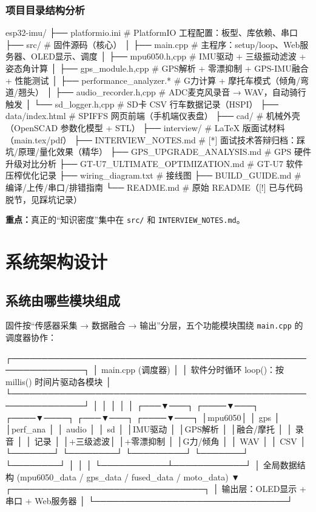 \documentclass[UTF8,11pt,a4paper]{ctexart}
\begin{document}
\subsubsection{项目目录结构分析}
\begin{ascii}
esp32-imu/
├── platformio.ini              # PlatformIO 工程配置：板型、库依赖、串口
├── src/                        # 固件源码（核心）
│   ├── main.cpp                # 主程序：setup/loop、Web服务器、OLED显示、调度
│   ├── mpu6050.{h,cpp}         # IMU驱动 + 三级振动滤波 + 姿态角计算
│   ├── gps_module.{h,cpp}      # GPS解析 + 零漂抑制 + GPS-IMU融合 + 性能测试
│   ├── performance_analyzer.*  # G力计算 + 摩托车模式（倾角/弯道/翘头）
│   ├── audio_recorder.{h,cpp}  # ADC麦克风录音 → WAV，自动骑行触发
│   └── sd_logger.{h,cpp}       # SD卡 CSV 行车数据记录（HSPI）
├── data/index.html             # SPIFFS 网页前端（手机端仪表盘）
├── cad/                        # 机械外壳（OpenSCAD 参数化模型 + STL）
├── interview/                  # LaTeX 版面试材料（main.tex/pdf）
├── INTERVIEW_NOTES.md          # [*] 面试技术答辩归档：踩坑/原理/量化效果（精华）
├── GPS_UPGRADE_ANALYSIS.md     # GPS 硬件升级对比分析
├── GT-U7_ULTIMATE_OPTIMIZATION.md  # GT-U7 软件压榨优化记录
├── wiring_diagram.txt          # 接线图
├── BUILD_GUIDE.md              # 编译/上传/串口/排错指南
└── README.md                   # 原始 README（[!] 已与代码脱节，见踩坑记录）
\end{ascii}
\noindent\textbf{重点：}真正的“知识密度”集中在 \texttt{src/} 和 \texttt{INTERVIEW\_NOTES.md}。

\section{系统架构设计}

\subsection{系统由哪些模块组成}
固件按“传感器采集 → 数据融合 → 输出”分层，五个功能模块围绕 \texttt{main.cpp} 的调度器协作：

\begin{ascii}
┌──────────────────────────────────────────────────────────────┐
│                       main.cpp (调度器)                        │
│   软件分时循环 loop()：按 millis() 时间片驱动各模块            │
└──────────────────────────────────────────────────────────────┘
      │           │            │           │           │
  ┌───▼───┐  ┌────▼───┐   ┌────▼────┐  ┌───▼───┐  ┌────▼───┐
  │mpu6050│  │  gps   │   │perf_ana │  │ audio │  │   sd   │
  │IMU驱动 │  │GPS解析  │   │融合/摩托 │  │ 录音  │  │  记录  │
  │+三级滤波│ │+零漂抑制 │  │G力/倾角 │  │ WAV  │  │  CSV   │
  └───────┘  └────────┘   └─────────┘  └───────┘  └────────┘
      │           │            │
      └───────────┴────────────┘
                  │ 全局数据结构 (mpu6050_data / gps_data / fused_data / moto_data)
                  ▼
        ┌────────────────────────────────┐
        │ 输出层：OLED显示 + 串口 + Web服务器 │
        └────────────────────────────────┘
\end{ascii}
\end{document}
